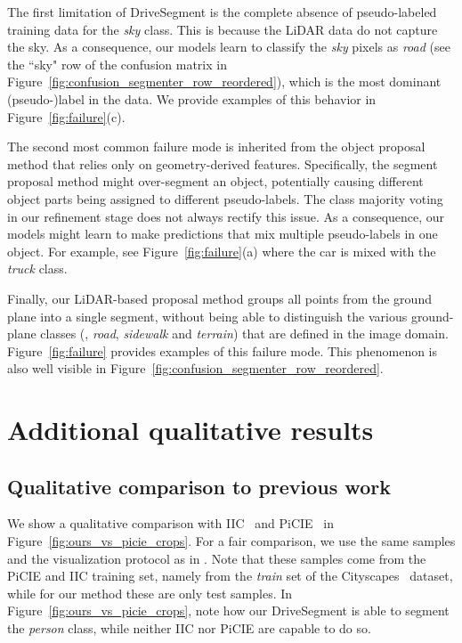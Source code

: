 \documentclass[runningheads]{llncs}
\newcommand{\ours}{DriveSegment\xspace}
\begin{document}
The first limitation of \ours is the complete absence of pseudo-labeled training data for the \emph{sky} class.
This is because 
the LiDAR data do not capture the sky.
As a consequence, our models learn to classify the \emph{sky} pixels as \emph{road} (see the ``sky" row of the confusion matrix in Figure~\ref{fig:confusion_segmenter_row_reordered}),
which is the most dominant (pseudo-)label in the data.
We provide examples of this behavior in  Figure~\ref{fig:failure}(c).

The second most common failure mode is inherited from the object proposal method that relies only on geometry-derived features. 
Specifically, the segment proposal method might over-segment an object, 
potentially causing different object parts being assigned to different pseudo-labels.
The class majority voting in our refinement stage does not always rectify this issue.
As a consequence, our models might learn to make predictions that mix multiple pseudo-labels in one object. 
For example, see Figure~\ref{fig:failure}(a) where the car is mixed with the \emph{truck} class.


Finally, our LiDAR-based proposal method groups all points from the ground plane into a single segment, without being able to distinguish the various ground-plane classes (\eg, \textit{road}, \textit{sidewalk} and \textit{terrain}) that are defined in the image domain. Figure~\ref{fig:failure} provides examples of this failure mode. This phenomenon is also well visible in Figure~\ref{fig:confusion_segmenter_row_reordered}.







\section{Additional qualitative results}

\subsection{Qualitative comparison to previous work}
\label{sec:qual}
We show a qualitative comparison with IIC~\cite{ji2019invariant} and PiCIE~\cite{cho2021picie} in Figure~\ref{fig:ours_vs_picie_crops}. 
For a fair comparison, we 
use the same samples and the visualization protocol as in \cite{cho2021picie}. 
Note that these samples come from the PiCIE and IIC training set, namely from the \emph{train} set of the Cityscapes~\cite{Cordts2016Cityscapes} dataset, while for our method these are only test samples. In Figure~\ref{fig:ours_vs_picie_crops}, note how our \ours is able to segment the \emph{person} class, while neither IIC nor PiCIE are capable to do so.
\end{document}
